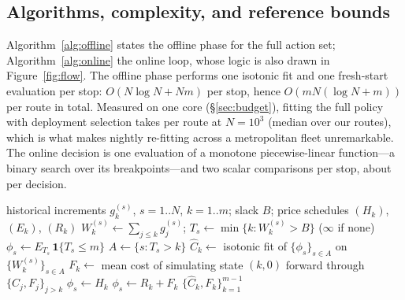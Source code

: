\documentclass[preprint,authoryear,12pt]{elsarticle}
\theoremstyle{definition}
\theoremstyle{remark}
\begin{document}
\subsection{Algorithms, complexity, and reference bounds}
\label{sec:algorithms}

Algorithm~\ref{alg:offline} states the offline phase for the full
action set; Algorithm~\ref{alg:online} the online loop, whose logic is
also drawn in Figure~\ref{fig:flow}. The offline phase performs one
isotonic fit and one fresh-start evaluation per stop:
$O(N \log N + Nm)$ per stop, hence $O(mN(\log N + m))$ per route in
total. Measured on one core (\S\ref{sec:budget}), fitting the full
policy with deployment selection takes \timeBatonMs{} per route at
$N = 10^3$ (median over our routes), which is what makes nightly
re-fitting across a metropolitan fleet unremarkable. The online decision
is one evaluation of a monotone piecewise-linear function---a binary
search over its breakpoints---and two scalar comparisons per stop, about
\timeOnlineUs{} per decision.

\begin{algorithm}[t]
\caption{\textsc{Baton} offline phase: peak-aware backward induction
over the full action set}
\label{alg:offline}
\begin{algorithmic}[1]
\Require historical increments $g^{(s)}_k$, $s = 1..N$, $k = 1..m$;
         slack $B$; price schedules $(H_k)$, $(E_k)$, $(R_k)$
\State $W^{(s)}_k \gets \sum_{j\le k} g^{(s)}_j$;\quad
       $T_s \gets \min\{k : W^{(s)}_k > B\}$ ($\infty$ if none)
\State $\phi_s \gets E_{T_s}\,\mathbf 1\{T_s \le m\}$
  \State $A \gets \{s : T_s > k\}$ 
  \State $\widehat C_k \gets$ isotonic fit of $\{\phi_s\}_{s\in A}$ on
         $\{W^{(s)}_k\}_{s\in A}$
  \State $F_k \gets$ mean cost of simulating state $(k,0)$ forward
         through $\{\widehat C_j, F_j\}_{j>k}$
   
      \State $\phi_s \gets H_k$ 
      \State $\phi_s \gets R_k + F_k$ 
    \EndIf {}
  \EndFor
\EndFor
\State \Return $\{\widehat C_k, F_k\}_{k=1}^{m-1}$
\end{algorithmic}
\end{algorithm}
\end{document}
